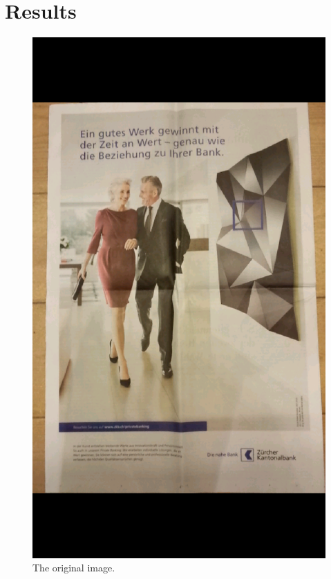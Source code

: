 \documentclass[10pt,conference,compsocconf]{IEEEtran}
\begin{document}
\section{Results}
\begin{figure}[t]
    \begin{minipage}[t]{0.33\textwidth}
         \includegraphics[width=\columnwidth]{Screenshot_2014-01-21-23-51-46.png}
        \caption{The original image.}
        \label{fig:initial}
    \end{minipage}

\end{figure}
\end{document}
